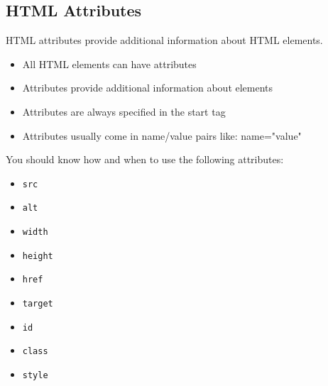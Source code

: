 \documentclass[english,11pt,a4paper]{report}
\begin{document}
\subsection{HTML Attributes}
HTML attributes provide additional information about HTML elements.

\begin{itemize}
	\item All HTML elements can have attributes
    \item Attributes provide additional information about elements
    \item Attributes are always specified in the start tag
    \item Attributes usually come in name/value pairs like: name="value"
\end{itemize}

You should know how and when to use the following attributes:
\begin{itemize}
    \item \verb|src|
    \item \verb|alt|
    \item \verb|width|
    \item \verb|height|
    \item \verb|href|
    \item \verb|target|
    \item \verb|id|
    \item \verb|class|
    \item \verb|style|
\end{itemize}
\end{document}
